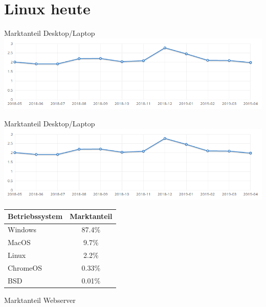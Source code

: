\documentclass[10pt]{beamer}
\begin{document}
\section{Linux heute}

\begin{frame}{Marktanteil Desktop/Laptop}
		\includegraphics[keepaspectratio, width=\textwidth]{img/market_share.png}
\end{frame}

\begin{frame}{Marktanteil Desktop/Laptop}
\includegraphics[keepaspectratio, width=\textwidth]{img/market_share.png}

	\centering
	\begin{table}
		\begin{tabular}{l|c}
			\toprule
			\textbf{Betriebssystem} & \textbf{Marktanteil} \\
			\hline
			Windows & 87.4\% \\
			MacOS & 9.7\% \\
			Linux & 2.2\% \\
			ChromeOS & 0.33\% \\
			BSD & 0.01\% \\
			\bottomrule
		\end{tabular}
	\end{table}	
\end{frame}

\begin{frame}{Marktanteil Webserver}
	\centering
	\begin{bchart}[step=10,max=100]
			\smallskip
	\end{bchart}
\end{frame}
\end{document}

